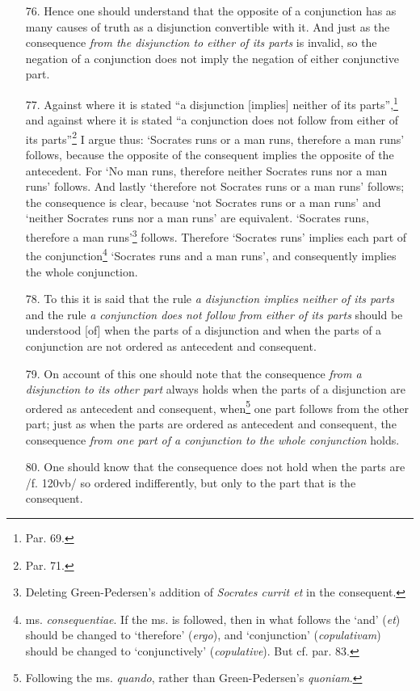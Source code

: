 \begin{enumerate}
\item[76.] Hence one should understand that the opposite of a conjunction has as many causes of truth as a disjunction convertible with it. And just as the consequence \textit{from the disjunction to either of its parts} is invalid, so the negation of a conjunction does not imply the negation of either conjunctive part.
\item[77.] Against where it is stated ``a disjunction [implies] neither of its parts'',\footnote{Par. 69.} and against where it is stated ``a conjunction does not follow from either of its parts''\footnote{Par. 71.} I argue thus: `Socrates runs or a man runs, therefore a man runs' follows, because the opposite of the consequent implies the opposite of the antecedent. For `No man runs, therefore neither Socrates runs nor a man runs' follows. And lastly `therefore not Socrates runs or a man runs' follows; the consequence is clear, because `not Socrates runs or a man runs' and `neither Socrates runs nor a man runs' are equivalent. `Socrates runs, therefore a man runs'\footnote{Deleting Green-Pedersen's addition of \textit{Socrates currit et} in the consequent.} follows. Therefore `Socrates runs' implies each part of the conjunction\footnote{ms. \textit{consequentiae}. If the ms. is followed, then in what follows the `and' (\textit{et})  should be changed to `therefore' (\textit{ergo}), and `conjunction' (\textit{copulativam}) should be changed to `conjunctively' (\textit{copulative}). But cf. par. 83.} `Socrates runs and a man runs', and consequently implies the whole conjunction.
\item[78.] To this it is said that the rule \textit{a disjunction implies neither of its parts} and the rule \textit{a conjunction does not follow from either of its parts} should be understood [of] when the parts of a disjunction and when the parts of a conjunction are not ordered as antecedent and consequent.
\item[79.] On account of this one should note that the consequence \textit{from a disjunction to its other part} always holds when the  parts of a disjunction are ordered as antecedent and consequent, when\footnote{Following the ms. \textit{quando}, rather than Green-Pedersen's \textit{quoniam}.} one part follows from the other part; just as when the parts are ordered as antecedent and consequent, the consequence \textit{from one part of a conjunction to the whole conjunction} holds.
\item[80.] One should know that the consequence does not hold when the parts are /f. 120vb/ so ordered indifferently, but only to the part that is the consequent.

\end{enumerate}

